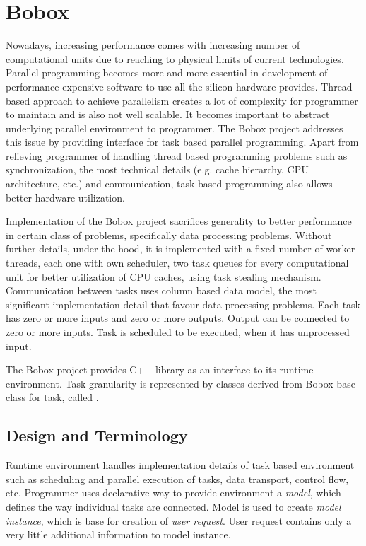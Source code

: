 \chapter{Bobox}
Nowadays, increasing performance comes with increasing number of computational units due to reaching to physical limits of current technologies. Parallel programming becomes more and more essential in development of performance expensive software to use all the silicon hardware provides. Thread based approach to achieve parallelism creates a lot of complexity for programmer to maintain and is also not well scalable. It becomes important to abstract underlying parallel environment to programmer. The Bobox project addresses this issue by providing interface for task based parallel programming. Apart from relieving programmer of handling thread based programming problems such as synchronization, the most technical details (e.g. cache hierarchy, CPU architecture, etc.) and communication, task based programming also allows better hardware utilization.

Implementation of the Bobox project sacrifices generality to better performance in certain class of problems, specifically data processing problems. Without further details, under the hood, it is implemented with a fixed number of worker threads, each one with own scheduler, two task queues for every computational unit for better utilization of CPU caches, using task stealing mechanism. Communication between tasks uses column based data model, the most significant implementation detail that favour data processing problems. Each task has zero or more inputs and zero or more outputs. Output can be connected to zero or more inputs. Task is scheduled to be executed, when it has unprocessed input.

The Bobox project provides C++ library as an interface to its runtime environment. Task granularity is represented by classes derived from Bobox base class for task, called .

\section{Design and Terminology}
Runtime environment handles implementation details of task based environment such as scheduling and parallel execution of tasks, data transport, control flow, etc. Programmer uses declarative way to provide environment a \textit{model}, which defines the way individual tasks are connected. Model is used to create \textit{model instance}, which is base for creation of \textit{user request}. User request contains only a very little additional information to model instance.

